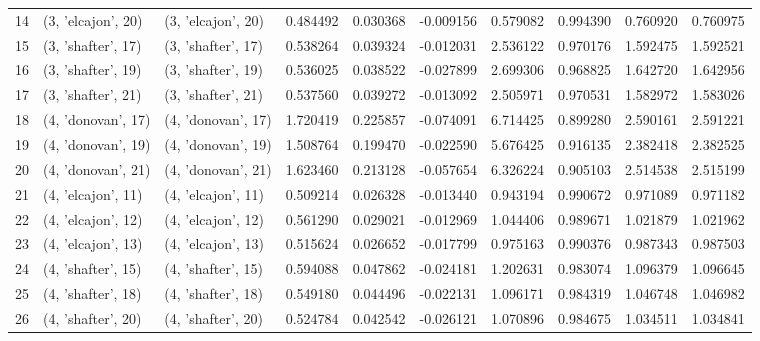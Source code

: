 \begin{tabular}{lllrrrrrrr}
14 &  (3, 'elcajon', 20) &  (3, 'elcajon', 20) &  0.484492 &   0.030368 & -0.009156 &  0.579082 &  0.994390 &   0.760920 &  0.760975 \\
15 &  (3, 'shafter', 17) &  (3, 'shafter', 17) &  0.538264 &   0.039324 & -0.012031 &  2.536122 &  0.970176 &   1.592475 &  1.592521 \\
16 &  (3, 'shafter', 19) &  (3, 'shafter', 19) &  0.536025 &   0.038522 & -0.027899 &  2.699306 &  0.968825 &   1.642720 &  1.642956 \\
17 &  (3, 'shafter', 21) &  (3, 'shafter', 21) &  0.537560 &   0.039272 & -0.013092 &  2.505971 &  0.970531 &   1.582972 &  1.583026 \\
18 &  (4, 'donovan', 17) &  (4, 'donovan', 17) &  1.720419 &   0.225857 & -0.074091 &  6.714425 &  0.899280 &   2.590161 &  2.591221 \\
19 &  (4, 'donovan', 19) &  (4, 'donovan', 19) &  1.508764 &   0.199470 & -0.022590 &  5.676425 &  0.916135 &   2.382418 &  2.382525 \\
20 &  (4, 'donovan', 21) &  (4, 'donovan', 21) &  1.623460 &   0.213128 & -0.057654 &  6.326224 &  0.905103 &   2.514538 &  2.515199 \\
21 &  (4, 'elcajon', 11) &  (4, 'elcajon', 11) &  0.509214 &   0.026328 & -0.013440 &  0.943194 &  0.990672 &   0.971089 &  0.971182 \\
22 &  (4, 'elcajon', 12) &  (4, 'elcajon', 12) &  0.561290 &   0.029021 & -0.012969 &  1.044406 &  0.989671 &   1.021879 &  1.021962 \\
23 &  (4, 'elcajon', 13) &  (4, 'elcajon', 13) &  0.515624 &   0.026652 & -0.017799 &  0.975163 &  0.990376 &   0.987343 &  0.987503 \\
24 &  (4, 'shafter', 15) &  (4, 'shafter', 15) &  0.594088 &   0.047862 & -0.024181 &  1.202631 &  0.983074 &   1.096379 &  1.096645 \\
25 &  (4, 'shafter', 18) &  (4, 'shafter', 18) &  0.549180 &   0.044496 & -0.022131 &  1.096171 &  0.984319 &   1.046748 &  1.046982 \\
26 &  (4, 'shafter', 20) &  (4, 'shafter', 20) &  0.524784 &   0.042542 & -0.026121 &  1.070896 &  0.984675 &   1.034511 &  1.034841 \\
\bottomrule
\end{tabular}

